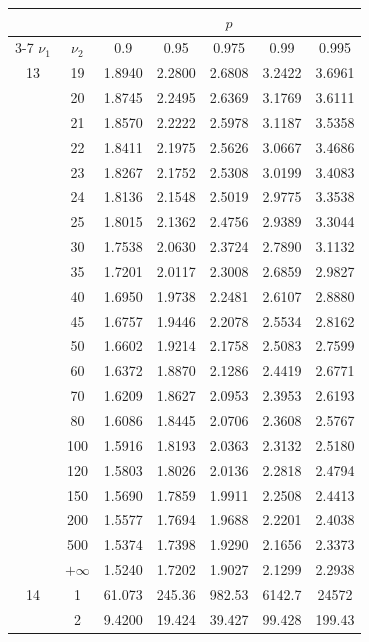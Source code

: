 \newpage
\noindent
\begin{minipage}{0.49\textwidth}
	\begin{center}
		\begin{tabular}{ccccccc}
			& & \multicolumn{5}{c}{$p$}\\
			\cline{3-7}
			$\nu_1$ & $\nu_2$ & 0.9 & 0.95 & 0.975 & 0.99 & 0.995 \\
			\midrule
			13 & 19 & 1.8940 & 2.2800 & 2.6808 & 3.2422 & 3.6961 \\[5pt]
			& 20 & 1.8745 & 2.2495 & 2.6369 & 3.1769 & 3.6111 \\
			& 21 & 1.8570 & 2.2222 & 2.5978 & 3.1187 & 3.5358 \\
			& 22 & 1.8411 & 2.1975 & 2.5626 & 3.0667 & 3.4686 \\
			& 23 & 1.8267 & 2.1752 & 2.5308 & 3.0199 & 3.4083 \\
			& 24 & 1.8136 & 2.1548 & 2.5019 & 2.9775 & 3.3538 \\
			& 25 & 1.8015 & 2.1362 & 2.4756 & 2.9389 & 3.3044 \\
			& 30 & 1.7538 & 2.0630 & 2.3724 & 2.7890 & 3.1132 \\
			& 35 & 1.7201 & 2.0117 & 2.3008 & 2.6859 & 2.9827 \\
			& 40 & 1.6950 & 1.9738 & 2.2481 & 2.6107 & 2.8880 \\
			& 45 & 1.6757 & 1.9446 & 2.2078 & 2.5534 & 2.8162 \\[5pt]
			& 50 & 1.6602 & 1.9214 & 2.1758 & 2.5083 & 2.7599 \\
			& 60 & 1.6372 & 1.8870 & 2.1286 & 2.4419 & 2.6771 \\
			& 70 & 1.6209 & 1.8627 & 2.0953 & 2.3953 & 2.6193 \\
			& 80 & 1.6086 & 1.8445 & 2.0706 & 2.3608 & 2.5767 \\
			& 100 & 1.5916 & 1.8193 & 2.0363 & 2.3132 & 2.5180 \\
			& 120 & 1.5803 & 1.8026 & 2.0136 & 2.2818 & 2.4794 \\
			& 150 & 1.5690 & 1.7859 & 1.9911 & 2.2508 & 2.4413 \\
			& 200 & 1.5577 & 1.7694 & 1.9688 & 2.2201 & 2.4038 \\
			& 500 & 1.5374 & 1.7398 & 1.9290 & 2.1656 & 2.3373 \\
			& $+\infty$ & 1.5240 & 1.7202 & 1.9027 & 2.1299 & 2.2938 \\
			\midrule
			14 & 1 & 61.073 & 245.36 & 982.53 & 6142.7 & 24572 \\
			& 2 & 9.4200 & 19.424 & 39.427 & 99.428 & 199.43 \\

\end{tabular}
\end{center}
\end{minipage}

